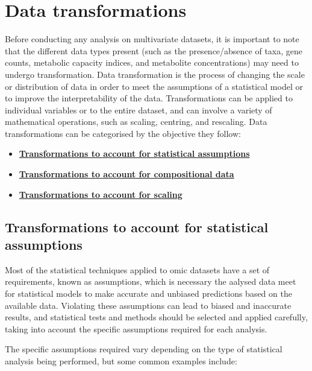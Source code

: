 \documentclass[
]{book}
\providecommand{\tightlist}{%
  \setlength{\itemsep}{0pt}\setlength{\parskip}{0pt}}
\begin{document}
\hypertarget{data-transformations}{%
\chapter{Data transformations}\label{data-transformations}}

Before conducting any analysis on multivariate datasets, it is important to note that the different data types present (such as the presence/absence of taxa, gene counts, metabolic capacity indices, and metabolite concentrations) may need to undergo transformation. Data transformation is the process of changing the scale or distribution of data in order to meet the assumptions of a statistical model or to improve the interpretability of the data. Transformations can be applied to individual variables or to the entire dataset, and can involve a variety of mathematical operations, such as scaling, centring, and rescaling. Data transformations can be categorised by the objective they follow:

\begin{itemize}
\tightlist
\item
  \textbf{\protect\hyperlink{data-transformation-assumptions}{Transformations to account for statistical assumptions}}
\item
  \textbf{\protect\hyperlink{data-transformation-assumptions}{Transformations to account for compositional data}}
\item
  \textbf{\protect\hyperlink{data-transformation-scaling}{Transformations to account for scaling}}
\end{itemize}

\hypertarget{data-transformation-assumptions}{%
\section{Transformations to account for statistical assumptions}\label{data-transformation-assumptions}}

Most of the statistical techniques applied to omic datasets have a set of requirements, known as assumptions, which is necessary the aalysed data meet for statistical models to make accurate and unbiased predictions based on the available data. Violating these assumptions can lead to biased and inaccurate results, and statistical tests and methods should be selected and applied carefully, taking into account the specific assumptions required for each analysis.

The specific assumptions required vary depending on the type of statistical analysis being performed, but some common examples include:
\end{document}

